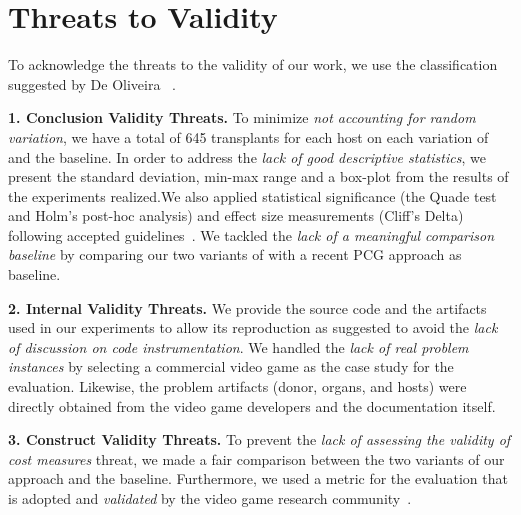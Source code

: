 \section{Threats to Validity}
\label{sec:Threats}

To acknowledge the threats to the validity of our work, we use the classification suggested by De Oliveira \etal~\cite{oliveira2011threats}.

\textbf{1. Conclusion Validity Threats.}
To minimize \textit{not accounting for random variation}, we have a total of 645 transplants for each host on each variation of \ApproachName{} and the baseline.
In order to address the \textit{lack of good descriptive statistics}, we present the standard deviation, min-max range and a box-plot from the results of the experiments realized.We also applied statistical significance (the Quade test and Holm’s post-hoc analysis) and effect size measurements (Cliff’s Delta) following accepted guidelines~\cite{arcuri2013parameter}.
We tackled the \textit{lack of a meaningful comparison baseline} by comparing our two variants of \ApproachName{} with a recent PCG approach as baseline. 


\textbf{2. Internal Validity Threats.}
We provide the source code and the artifacts used in our experiments to allow its reproduction as suggested to avoid the \textit{lack of discussion on code instrumentation}.
We handled the \textit{lack of real problem instances} by selecting a commercial video game as the case study for the evaluation. Likewise, the problem artifacts (donor, organs, and hosts) were directly obtained from the video game developers and the documentation itself. 

\textbf{3. Construct Validity Threats.}
To prevent the \textit{lack of assessing the validity of cost measures} threat, we made a fair comparison between the two variants of our approach and the baseline. Furthermore, we used a metric for the evaluation that is adopted and \textit{validated} by the video game research community~\cite{browne2010evolutionary}.

